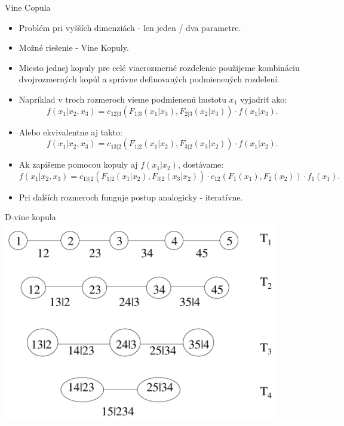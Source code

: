 \documentclass{Bredelebeamer}
\begin{document}
\begin{frame}{Vine Copula}
	\begin{itemize}
		\item Problém pri vyšších dimenziách - len jeden / dva parametre.
		\item Možné riešenie - Vine Kopuly.
		\item Miesto jednej kopuly pre celé viacrozmerné rozdelenie použijeme kombináciu dvojrozmerných kopúl a správne definovaných podmienených rozdelení.
		\item Napríklad v troch rozmeroch vieme podmienenú hustotu $x_1$ vyjadriť ako:
		\begin{equation}
			f(x_1|x_2, x_3) = c_{12|3}(F_{1|3}(x_1|x_3), F_{2|3}(x_2|x_3))\cdot f(x_1|x_3).
		\end{equation}
		\item Alebo ekvivalentne aj takto:
		\begin{equation}
			f(x_1|x_2, x_3) = c_{13|2}(F_{1|2}(x_1|x_2), F_{3|2}(x_3|x_2))\cdot f(x_1|x_2).
		\end{equation}
		\item Ak zapíšeme pomocou kopuly aj $f(x_1|x_2)$, dostávame:
		\begin{equation}
			f(x_1|x_2, x_3) = c_{13|2}(F_{1|2}(x_1|x_2), F_{3|2}(x_3|x_2))\cdot c_{12}(F_1(x_1), F_2(x_2))\cdot f_1(x_1).
		\end{equation}
		\item Pri ďalších rozmeroch funguje postup analogicky - iteratívne.
	\end{itemize}
\end{frame}

\begin{frame}{D-vine kopula}
	\centering
	\includegraphics[width=0.9\textwidth]{Figures/d-vine}
\end{frame}
\end{document}
